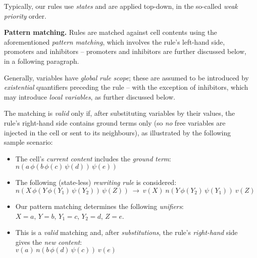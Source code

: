 Typically, our rules use \emph{states} and are applied top-down, in the so-called \emph{weak priority} order.

\smallskip
\noindent
\textbf{Pattern matching.}
Rules are matched against cell contents using the aforementioned \emph{pattern matching},
which involves the rule's left-hand side, promoters and inhibitors -- 
promoters and inhibitors are further discussed below, in a following paragraph.

Generally, variables have \emph{global rule scope};
these are assumed to be introduced by \emph{existential} quantifiers preceding the rule
-- with the exception of inhibitors, which may introduce \emph{local variables}, 
as further discussed below. 

The matching is \emph{valid} only if, after substituting variables by their values, 
the rule's right-hand side contains ground terms only
(so \emph{no} free variables are injected in the cell or sent to its neighbours),
as illustrated by the following sample scenario:
\begin{itemize}
\item The cell's \emph{current content} includes the \emph{ground term}:\\
$n(a \, \phi(b \, \phi(c) \, \psi(d)) \, \psi(e))$

\smallskip
\item The following (state-less) \emph{rewriting rule} is considered: \\ 
$n(X \, \phi(Y \, \phi(Y_1) \, \psi(Y_2)) \, \psi(Z)) ~ \rightarrow ~ v(X) \: n(Y \, \phi(Y_2) \, \psi(Y_1)) \: v(Z)$

\smallskip
\item Our pattern matching determines the following \emph{unifiers}: \\
$X = a$, $Y = b$, $Y_1 = c$, $ Y_2 = d$, $Z = e$.

\smallskip
\item This is a \emph{valid} matching and, after \emph{substitutions}, 
the rule's \emph{right-hand} side gives the \emph{new content}: \\
$v(a) ~ n(b \, \phi(d) \, \psi(c)) ~ v(e)$
\end{itemize}

